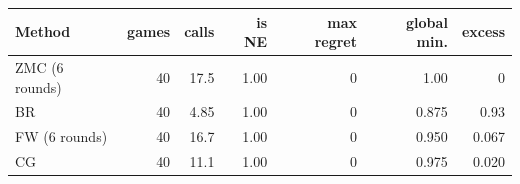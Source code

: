 \begin{tabular}{lrrrrrr}
\toprule
Method & games & calls & is NE & max regret & global min. & excess \\
\midrule
ZMC (6 rounds) & 40 & 17.5 & 1.00 & 0 & 1.00 & 0 \\
BR & 40 & 4.85 & 1.00 & 0 & 0.875 & 0.93 \\
FW (6 rounds) & 40 & 16.7 & 1.00 & 0 & 0.950 & 0.067 \\
CG & 40 & 11.1 & 1.00 & 0 & 0.975 & 0.020 \\
\bottomrule
\end{tabular}
